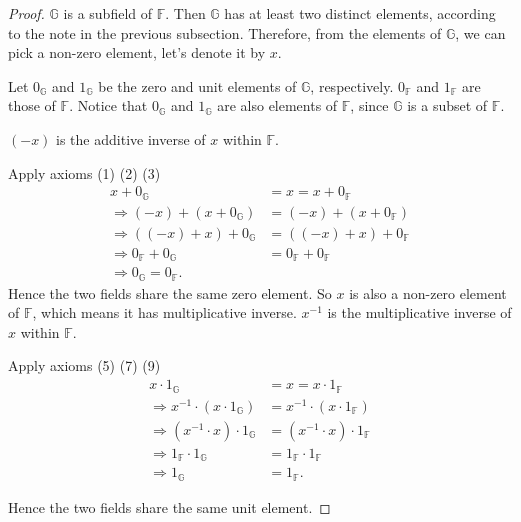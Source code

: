 \begin{proof}
    $\mathbb{G}$ is a subfield of $\mathbb{F}$. Then $\mathbb{G}$ has at least two distinct elements, according to the note in the previous subsection. Therefore, from the elements of $\mathbb{G}$, we can pick a non-zero element, let's denote it by $x$.

    Let $0_{\mathbb{G}}$ and $1_{\mathbb{G}}$ be the zero and unit elements of $\mathbb{G}$, respectively. $0_{\mathbb{F}}$ and $1_{\mathbb{F}}$ are those of $\mathbb{F}$. Notice that $0_{\mathbb{G}}$ and $1_{\mathbb{G}}$ are also elements of $\mathbb{F}$, since $\mathbb{G}$ is a subset of $\mathbb{F}$.

    $(-x)$ is the additive inverse of $x$ within $\mathbb{F}$.

    Apply axioms (1) (2) (3)
    \begin{align*}
        x + 0_{\mathbb{G}}                          & = x = x + 0_{\mathbb{F}}          \\
        \Rightarrow (-x) + (x + 0_{\mathbb{G}})     & = (-x) + (x + 0_{\mathbb{F}})     \\
        \Rightarrow ((-x) + x) + 0_{\mathbb{G}}     & = ((-x) + x) + 0_{\mathbb{F}}     \\
        \Rightarrow 0_{\mathbb{F}} + 0_{\mathbb{G}} & = 0_{\mathbb{F}} + 0_{\mathbb{F}} \\
        \Rightarrow 0_{\mathbb{G}} = 0_{\mathbb{F}}.
    \end{align*}
    Hence the two fields share the same zero element. So $x$ is also a non-zero element of $\mathbb{F}$, which means it has multiplicative inverse. $x^{-1}$ is the multiplicative inverse of $x$ within $\mathbb{F}$.

    Apply axioms (5) (7) (9)
    \begin{align*}
        x\cdot 1_{\mathbb{G}}                           & = x = x\cdot 1_{\mathbb{F}}           \\
        \Rightarrow x^{-1}\cdot (x\cdot 1_{\mathbb{G}}) & = x^{-1}\cdot (x\cdot 1_{\mathbb{F}}) \\
        \Rightarrow (x^{-1}\cdot x)\cdot 1_{\mathbb{G}} & = (x^{-1}\cdot x)\cdot 1_{\mathbb{F}} \\
        \Rightarrow 1_{\mathbb{F}}\cdot 1_{\mathbb{G}}  & = 1_{\mathbb{F}}\cdot 1_{\mathbb{F}}  \\
        \Rightarrow 1_{\mathbb{G}}                      & = 1_{\mathbb{F}}.
    \end{align*}

    Hence the two fields share the same unit element.
\end{proof}

